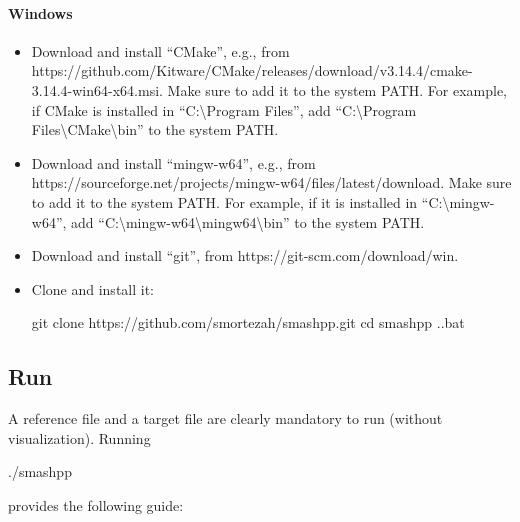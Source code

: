 \paragraph{Windows}
\begin{itemize}
  \item Download and install ``CMake'', e.g., from https://github.com/Kitware/CMake/releases/\linebreak download/v3.14.4/cmake-3.14.4-win64-x64.msi. Make sure to add it to the system PATH. For example, if CMake is installed in ``C:\textbackslash Program Files'', add ``C:\textbackslash Program Files\textbackslash CMake\textbackslash bin'' to the system PATH.
  \item Download and install ``mingw-w64'', e.g., from https://sourceforge.net/projects/mingw-w64/\linebreak files/latest/download. Make sure to add it to the system PATH. For example, if it is installed in ``C:\textbackslash mingw-w64'', add ``C:\textbackslash mingw-w64\textbackslash mingw64\textbackslash bin'' to the system PATH.
  \item Download and install ``git'', from https://git-scm.com/download/win.
  \item Clone \smashpp and install it:
\begin{code}[style=bash]
git clone https://github.com/smortezah/smashpp.git
cd smashpp
.\install.bat
\end{code}
\end{itemize}

\subsection{Run}
A reference file and a target file are clearly mandatory to run \smashpp (without visualization). Running
\begin{code}[style=bash]
./smashpp
\end{code}
provides the following guide:



